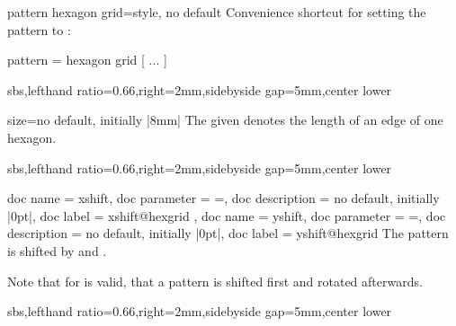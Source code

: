 \documentclass[a4paper,11pt]{article}
\begin{document}
\begin{myvoid}
\begin{docTikzKey}{pattern hexagon grid}{=}{style, no default}
  Convenience shortcut for setting the pattern to :
\begin{dispListing}
  pattern = { hexagon grid [ ... ] }
\end{dispListing}
\begin{dispExample*}{sbs,lefthand ratio=0.66,right=2mm,sidebyside gap=5mm,center lower}
\end{dispExample*}
\end{docTikzKey}



\begin{docPatternKey}[][doc label=size@hexgrid]{size}{=}{no default, initially |8mm|}
  The given  denotes the length of an edge of one hexagon.
\begin{dispExample*}{sbs,lefthand ratio=0.66,right=2mm,sidebyside gap=5mm,center lower}
\end{dispExample*}
\end{docPatternKey}

\clearpage


\begin{docPatternKeys}
  {
    {
      doc name        = xshift,
      doc parameter   = {=},
      doc description = {no default, initially |0pt|},
      doc label       = xshift@hexgrid
    },
    {
      doc name        = yshift,
      doc parameter   = {=},
      doc description = {no default, initially |0pt|},
      doc label       = yshift@hexgrid
    }
  }
  The pattern is shifted by  and .
  \par
  Note that for  is valid, that a pattern is shifted first and rotated afterwards.
\begin{dispExample*}{sbs,lefthand ratio=0.66,right=2mm,sidebyside gap=5mm,center lower}
\end{dispExample*}
\end{docPatternKeys}



\end{myvoid}
\end{document}
